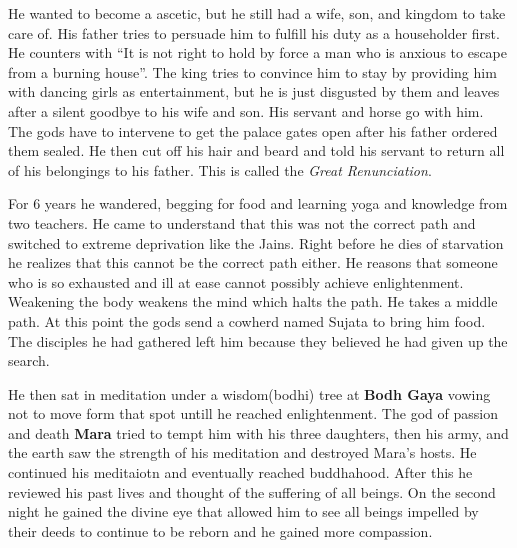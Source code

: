 \documentclass{article}
\begin{document}
He wanted to become a ascetic, but he still had a wife, son, and kingdom to take care of. His father tries to persuade him to fulfill his duty as a householder first. He counters with ``It is not right to hold by force a man who is anxious to escape from a burning house''. The king tries to convince him to stay by providing him with dancing girls as entertainment, but he is just disgusted by them and leaves after a silent goodbye to his wife and son. His servant and horse go with him. The gods have to intervene to get the palace gates open after his father ordered them sealed. He then cut off his hair and beard and told his servant to return all of his belongings to his father. This is called the \emph{Great Renunciation}.

For 6 years he wandered, begging for food and learning yoga and knowledge from two teachers. He came to understand that this was not the correct path and switched to extreme deprivation like the Jains. Right before he dies of starvation he realizes that this cannot be the correct path either. He reasons that someone who is so exhausted and ill at ease cannot possibly achieve enlightenment. Weakening the body weakens the mind which halts the path. He takes a middle path. At this point the gods send a cowherd named Sujata to bring him food. The disciples he had gathered left him because they believed he had given up the search.

He then sat in meditation under a wisdom(bodhi) tree at \textbf{Bodh Gaya} vowing not to move form that spot untill he reached enlightenment. The god of passion and death \textbf{Mara} tried to tempt him with his three daughters, then his army, and the earth saw the strength of his meditation and destroyed Mara's hosts. He continued his meditaiotn and eventually reached buddhahood. After this he reviewed his past lives and thought of the suffering of all beings. On the second night he gained the divine eye that allowed him to see all beings impelled by their deeds to continue to be reborn and he gained more compassion.
\end{document}
